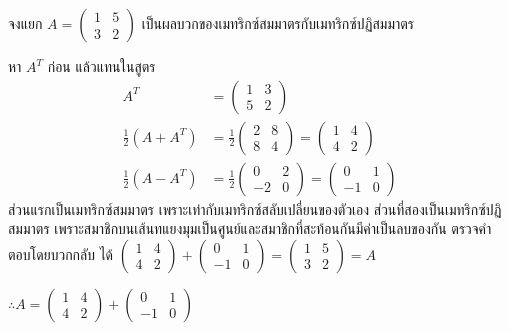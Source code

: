 \begin{ex}
\label{ex:symmetric-decomposition}
จงแยก $A = \begin{pmatrix} 1 & 5 \\ 3 & 2 \end{pmatrix}$ เป็นผลบวกของเมทริกซ์สมมาตรกับเมทริกซ์ปฏิสมมาตร
\end{ex}
\begin{solution}
หา $A^T$ ก่อน แล้วแทนในสูตร
\begin{align*}
A^T &= \begin{pmatrix} 1 & 3 \\ 5 & 2 \end{pmatrix}\\[0.4em]
\tfrac{1}{2}(A + A^T) &= \tfrac{1}{2}\begin{pmatrix} 2 & 8 \\ 8 & 4 \end{pmatrix} = \begin{pmatrix} 1 & 4 \\ 4 & 2 \end{pmatrix}\\[0.4em]
\tfrac{1}{2}(A - A^T) &= \tfrac{1}{2}\begin{pmatrix} 0 & 2 \\ -2 & 0 \end{pmatrix} = \begin{pmatrix} 0 & 1 \\ -1 & 0 \end{pmatrix}
\end{align*}
ส่วนแรกเป็นเมทริกซ์สมมาตร เพราะเท่ากับเมทริกซ์สลับเปลี่ยนของตัวเอง ส่วนที่สองเป็นเมทริกซ์ปฏิสมมาตร เพราะสมาชิกบนเส้นทแยงมุมเป็นศูนย์และสมาชิกที่สะท้อนกันมีค่าเป็นลบของกัน
ตรวจคำตอบโดยบวกกลับ ได้ $\begin{pmatrix} 1 & 4 \\ 4 & 2 \end{pmatrix} + \begin{pmatrix} 0 & 1 \\ -1 & 0 \end{pmatrix} = \begin{pmatrix} 1 & 5 \\ 3 & 2 \end{pmatrix} = A$

$\therefore A = \begin{pmatrix} 1 & 4 \\ 4 & 2 \end{pmatrix} + \begin{pmatrix} 0 & 1 \\ -1 & 0 \end{pmatrix}$ \solhere
\end{solution}


